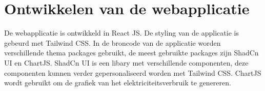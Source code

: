 \section{Ontwikkelen van de webapplicatie}
\label{sec:proefopstelling-webapplicatie}

De webapplicatie is ontwikkeld in React JS. De styling van de applicatie is gebeurd met Tailwind CSS. In de broncode van de applicatie worden verschillende thema packages gebruikt, de meest gebruikte packages zijn ShadCn UI en ChartJS. ShadCn UI is een libary met verschillende componenten, deze componenten kunnen verder gepersonaliseerd worden met Tailwind CSS. ChartJS wordt gebruikt om de grafiek van het elektriciteitsverbruik te genereren.